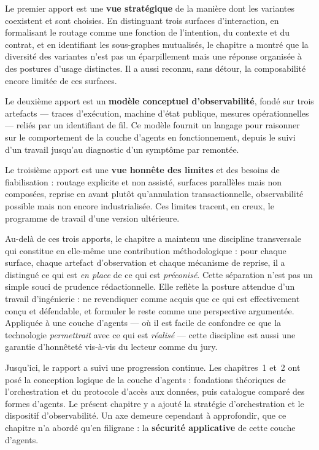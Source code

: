 Le premier apport est une \textbf{vue stratégique} de la manière dont
les variantes coexistent et sont choisies. En distinguant trois
surfaces d'interaction, en formalisant le routage comme une fonction
de l'intention, du contexte et du contrat, et en identifiant les
sous-graphes mutualisés, le chapitre a montré que la diversité des
variantes n'est pas un éparpillement mais une réponse organisée à des
postures d'usage distinctes. Il a aussi reconnu, sans détour, la
composabilité encore limitée de ces surfaces.

Le deuxième apport est un \textbf{modèle conceptuel d'observabilité},
fondé sur trois artefacts — traces d'exécution, machine d'état publique,
mesures opérationnelles — reliés par un identifiant de fil. Ce modèle
fournit un langage pour raisonner sur le comportement de la couche
d'agents en fonctionnement, depuis le suivi d'un travail jusqu'au
diagnostic d'un symptôme par remontée.

Le troisième apport est une \textbf{vue honnête des limites} et des
besoins de fiabilisation : routage explicite et non assisté, surfaces
parallèles mais non composées, reprise en avant plutôt
qu'annulation transactionnelle, observabilité possible mais non encore
industrialisée. Ces limites tracent, en creux, le programme de travail
d'une version ultérieure.

Au-delà de ces trois apports, le chapitre a maintenu une discipline
transversale qui constitue en elle-même une contribution
méthodologique : pour chaque surface, chaque artefact d'observation et
chaque mécanisme de reprise, il a distingué ce qui est \emph{en place}
de ce qui est \emph{préconisé}. Cette séparation n'est pas un simple
souci de prudence rédactionnelle. Elle reflète la posture attendue d'un
travail d'ingénierie : ne revendiquer comme acquis que ce qui est
effectivement conçu et défendable, et formuler le reste comme une
perspective argumentée. Appliquée à une couche d'agents — où il est
facile de confondre ce que la technologie \emph{permettrait} avec ce
qui est \emph{réalisé} — cette discipline est aussi une garantie
d'honnêteté vis-à-vis du lecteur comme du jury.

Jusqu'ici, le rapport a suivi une progression continue. Les
chapitres~1 et~2 ont posé la conception logique de la couche d'agents :
fondations théoriques de l'orchestration et du protocole d'accès aux
données, puis catalogue comparé des formes d'agents. Le présent
chapitre y a ajouté la stratégie d'orchestration et le dispositif
d'observabilité. Un axe demeure cependant à approfondir, que ce
chapitre n'a abordé qu'en filigrane : la \textbf{sécurité applicative}
de cette couche d'agents.

